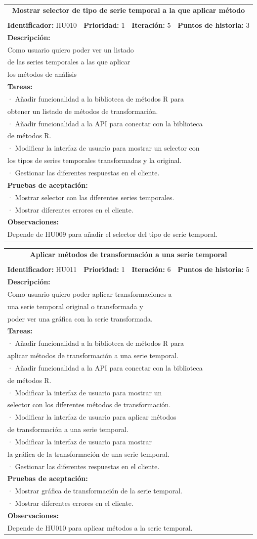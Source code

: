 \documentclass[14pt]{extarticle}
\theoremstyle{definition}
\theoremstyle{remark}
\newcommand{\newtableitem}[1] {
	\multicolumn{4}{|l|}{· #1} \\
}
\newcommand{\newtableline}[1] { %
	\multicolumn{4}{|l|}{#1} \\
}
\newcommand{\userstory}[9]{
	\begin{center}
	\resizebox{15cm}{!} {
	\begin{tabular}{|c|c|c|c|}
    	\hline 
		\multicolumn{4}{|c|}{\textbf{#1}} \\
		\multicolumn{4}{|c|}{} \\
		\hline	
		\textbf{Identificador:} #2 & \textbf{Prioridad:} #3 & \textbf{Iteración:} #4 & \textbf{Puntos de historia:} #5 \\ 
		\hline 
		\multicolumn{4}{|l|}{\textbf{Descripción:}} \\
		#6
		\hline 
		\multicolumn{4}{|l|}{\textbf{Tareas:}} \\
		#7
		\hline 
		\multicolumn{4}{|l|}{\textbf{Pruebas de aceptación:}} \\
		#8
		\hline 
		\multicolumn{4}{|l|}{\textbf{Observaciones:}} \\
		#9
		\hline 
	\end{tabular}
	}
	\end{center}
}
\begin{document}
\userstory {Mostrar selector de tipo de serie temporal a la que aplicar método}
{HU010}{1}{5}{3}
{
	\newtableline {Como usuario quiero poder ver un listado}
	\newtableline { de las series temporales a las que aplicar}
	\newtableline { los métodos de análisis}
}
{ %
	\newtableitem {Añadir funcionalidad a la biblioteca de métodos R para}
		\newtableline { obtener un listado de métodos de transformación.}
	\newtableitem {Añadir funcionalidad a la API para conectar con la biblioteca}
		\newtableline { de métodos R.}
	\newtableitem {Modificar la interfaz de usuario para mostrar un selector con}
		\newtableline { los tipos de series temporales transformadas y la original.}
	\newtableitem {Gestionar las diferentes respuestas en el cliente.}
}
{ %
	\newtableitem {Mostrar selector con las diferentes series temporales.}
	\newtableitem {Mostrar diferentes errores en el cliente.}
}
{ %
	\newtableline {Depende de HU009 para añadir el selector del tipo de serie temporal.} 
}

\userstory {Aplicar métodos de transformación a una serie temporal}
{HU011}{1}{6}{5}
{
	\newtableline {Como usuario quiero poder aplicar transformaciones a}
	\newtableline { una serie temporal original o transformada y}
	\newtableline { poder ver una gráfica con la serie transformada.}
}
{ %
	\newtableitem {Añadir funcionalidad a la biblioteca de métodos R para}
		\newtableline { aplicar métodos de transformación a una serie temporal.}
	\newtableitem {Añadir funcionalidad a la API para conectar con la biblioteca}
		\newtableline { de métodos R.}
	\newtableitem {Modificar la interfaz de usuario para mostrar un}
		\newtableline { selector con los diferentes métodos de transformación.}
	\newtableitem {Modificar la interfaz de usuario para aplicar métodos}
		\newtableline { de transformación a una serie temporal.}
	\newtableitem {Modificar la interfaz de usuario para mostrar }
		\newtableline { la gráfica de la transformación de una serie temporal.}
	\newtableitem {Gestionar las diferentes respuestas en el cliente.}
}
{ %
	\newtableitem {Mostrar gráfica de transformación de la serie temporal.}
	\newtableitem {Mostrar diferentes errores en el cliente.}
}
{ %
	\newtableline {Depende de HU010 para aplicar métodos a la serie temporal.} 
}
\end{document}
